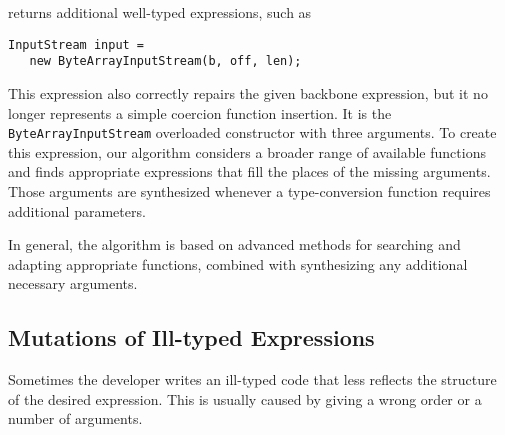 \ourTool returns additional well-typed expressions, such as 
\begin{lstlisting}    
InputStream input = 
   new ByteArrayInputStream(b, off, len);
\end{lstlisting}
This expression also correctly
repairs the given backbone expression, but it no longer represents a simple coercion
function insertion. It is the \lstinline{ByteArrayInputStream} overloaded 
constructor with three arguments. To create this expression, our algorithm
considers a broader range of available functions and finds appropriate
expressions that fill the places of the missing arguments. Those arguments
are synthesized whenever a type-conversion function requires additional parameters.

In general, the \ourTool algorithm is based on advanced methods for searching and adapting 
appropriate functions, combined with synthesizing any additional necessary
arguments.



\subsection{Mutations of Ill-typed Expressions}


Sometimes the developer writes an ill-typed code that less reflects
the structure of the desired expression. This is usually caused by giving a wrong order
or a number of arguments. 

